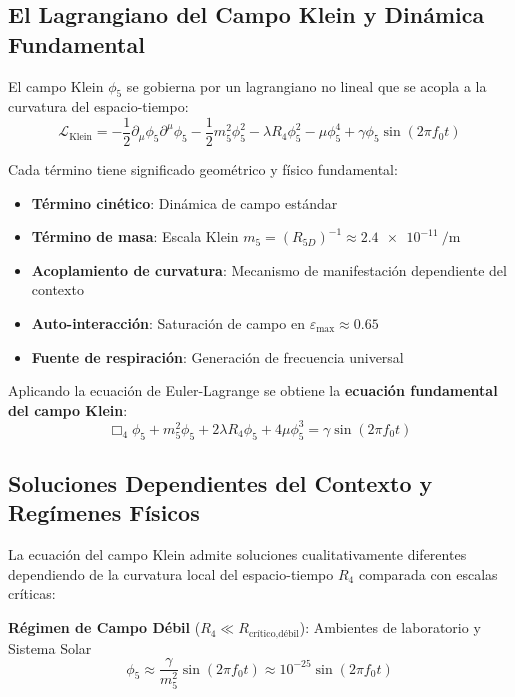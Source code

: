 \documentclass[aps,prl,twocolumn,showpacs,superscriptaddress,groupedaddress]{revtex4-1}
\newcommand{\phicinco}{\phi_5}
\newcommand{\epsmax}{\varepsilon_{\text{max}}}
\newcommand{\fcero}{f_0}
\newcommand{\Rcinco}{R_{5D}}
\newcommand{\Rcuatro}{R_4}
\newcommand{\dalembertiano}{\Box_4}
\begin{document}
\subsection{El Lagrangiano del Campo Klein y Dinámica Fundamental}

El campo Klein $\phicinco$ se gobierna por un lagrangiano no lineal que se acopla a la curvatura del espacio-tiempo:
\begin{equation}
\mathcal{L}_{\text{Klein}} = -\frac{1}{2} \partial_\mu\phicinco \partial^\mu\phicinco - \frac{1}{2}m_5^2\phicinco^2 - \lambda\Rcuatro\phicinco^2 - \mu\phicinco^4 + \gamma\phicinco \sin(2\pi\fcero t)
\label{eq:lagrangiano_klein}
\end{equation}

Cada término tiene significado geométrico y físico fundamental:
\begin{itemize}
\item \textbf{Término cinético}: Dinámica de campo estándar
\item \textbf{Término de masa}: Escala Klein $m_5 = (\Rcinco)^{-1} \approx \SI{2.4e-11}{\per\meter}$
\item \textbf{Acoplamiento de curvatura}: Mecanismo de manifestación dependiente del contexto
\item \textbf{Auto-interacción}: Saturación de campo en $\epsmax \approx 0.65$
\item \textbf{Fuente de respiración}: Generación de frecuencia universal
\end{itemize}

Aplicando la ecuación de Euler-Lagrange se obtiene la \textbf{ecuación fundamental del campo Klein}:
\begin{equation}
\dalembertiano\phicinco + m_5^2\phicinco + 2\lambda\Rcuatro\phicinco + 4\mu\phicinco^3 = \gamma \sin(2\pi\fcero t)
\label{eq:ecuacion_campo_klein}
\end{equation}

\subsection{Soluciones Dependientes del Contexto y Regímenes Físicos}

La ecuación del campo Klein admite soluciones cualitativamente diferentes dependiendo de la curvatura local del espacio-tiempo $\Rcuatro$ comparada con escalas críticas:

\textbf{Régimen de Campo Débil} ($\Rcuatro \ll R_{\text{crítico,débil}}$): Ambientes de laboratorio y Sistema Solar
\begin{equation}
\phicinco \approx \frac{\gamma}{m_5^2} \sin(2\pi\fcero t) \approx 10^{-25} \sin(2\pi\fcero t)
\end{equation}
\end{document}

